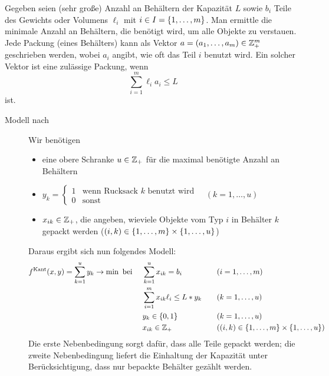 Gegeben seien (sehr große) Anzahl an Behältern der Kapazität $L$ sowie $b_i$ Teile des Gewichts oder Volumens $\ell_i$ mit $i \in I = \left\{ 1, \dots , m \right\}$. Man ermittle die minimale Anzahl an Behältern, die benötigt wird, um alle Objekte zu verstauen.
Jede Packung (eines Behälters) kann als Vektor $a = (a_1 , \dots , a_m) \in \mathbb{Z}_+^m$ geschrieben werden, wobei $a_i$ angibt, wie oft das Teil $i$ benutzt wird. Ein solcher Vektor ist eine zulässige Packung, wenn 
\begin{equation*}
	\sum_{i=1}^m \ell_i a_i \le L
\end{equation*} 
ist.

\begin{description}
	\item[Modell nach ] Wir benötigen 
	\begin{itemize}[nolistsep]
		\item eine obere Schranke $u \in \mathbb{Z}_+$ für die maximal benötigte Anzahl an Behältern
		\item $y_k = \begin{cases}
		1 & \text{wenn Rucksack } k \text{ benutzt wird} \\ 0 & \text{sonst}
		\end{cases} \quad (k = 1 , \dots , u)$
		\item $x_{ik} \in \mathbb{Z}_+$, die angeben, wieviele Objekte vom Typ $i$ in Behälter $k$ gepackt werden ($(i,k) \in \left\{ 1, \dots , m \right\} \times \left\{ 1, \dots , u \right\}$)
	\end{itemize}
	Daraus ergibt sich nun folgendes Modell:
	\begin{equation*}
		\begin{aligned}
		f^\text{Kant}(x,y) = \sum_{k=1}^u y_k \to \min \text{ bei } \quad & \sum_{k=1}^u x_{ik} = b_i \quad &&(i = 1, \dots , m) \\
		& \sum_{i=1}^m x_{ik} \ell_i \le L * y_k \quad &&(k = 1 , \dots , u) \\
		& y_k \in \left\{ 0,1 \right\} \quad &&(k = 1 , \dots , u) \\
		& x_{ik} \in \mathbb{Z}_+ \quad &&((i,k) \in \left\{ 1, \dots , m \right\} \times \left\{ 1, \dots , u \right\})
		\end{aligned}
	\end{equation*}
	Die erste Nebenbedingung sorgt dafür, dass alle Teile gepackt werden; die zweite Nebenbedingung liefert die Einhaltung der Kapazität unter Berücksichtigung, dass nur bepackte Behälter gezählt werden.


\end{description}
